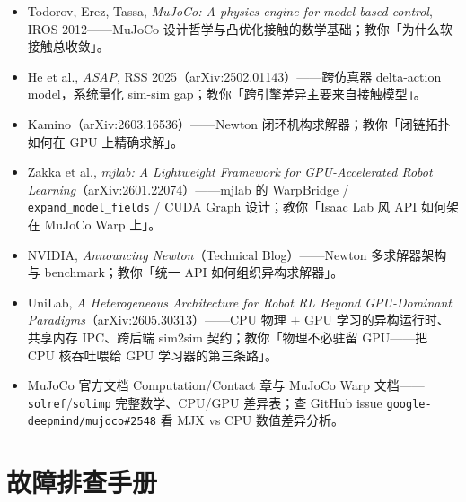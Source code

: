 \begin{itemize}
  \item Todorov, Erez, Tassa, \emph{MuJoCo: A physics engine for model-based control}, IROS 2012\cite{todorov2012mujoco}——MuJoCo 设计哲学与凸优化接触的数学基础；教你「为什么软接触总收敛」。
  \item He et al., \emph{ASAP}, RSS 2025（arXiv:2502.01143）\cite{asap2025}——跨仿真器 delta-action model，系统量化 sim-sim gap；教你「跨引擎差异主要来自接触模型」。
  \item Kamino（arXiv:2603.16536）\cite{kamino2026}——Newton 闭环机构求解器；教你「闭链拓扑如何在 GPU 上精确求解」。
  \item Zakka et al., \emph{mjlab: A Lightweight Framework for GPU-Accelerated Robot Learning}（arXiv:2601.22074）\cite{mjlab2026}——mjlab 的 WarpBridge / \verb|expand_model_fields| / CUDA Graph 设计；教你「Isaac Lab 风 API 如何架在 MuJoCo Warp 上」。
  \item NVIDIA, \emph{Announcing Newton}（Technical Blog）\cite{newton2026}——Newton 多求解器架构与 benchmark；教你「统一 API 如何组织异构求解器」。
  \item UniLab, \emph{A Heterogeneous Architecture for Robot RL Beyond GPU-Dominant Paradigms}（arXiv:2605.30313）\cite{unilab2026}——CPU 物理 $+$ GPU 学习的异构运行时、共享内存 IPC、跨后端 sim2sim 契约；教你「物理不必驻留 GPU——把 CPU 核吞吐喂给 GPU 学习器的第三条路」。
  \item MuJoCo 官方文档 Computation/Contact 章与 MuJoCo Warp 文档——\verb|solref|/\verb|solimp| 完整数学、CPU/GPU 差异表；查 GitHub issue \verb|google-deepmind/mujoco#2548| 看 MJX vs CPU 数值差异分析。
\end{itemize}

\section*{故障排查手册}
\label{sec:rlmc-phys-trouble}

